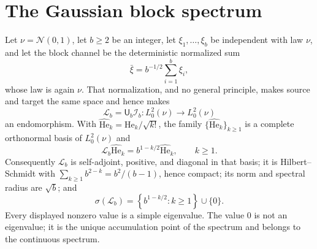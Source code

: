 \section{The Gaussian block spectrum}

Let \(\nu=\mathcal N(0,1)\), let \(b\geq2\) be an integer, let \(\xi_1,\dots,\xi_b\) be
independent with law \(\nu\), and let the block channel be the deterministic
normalized sum
\begin{equation}
\bar\xi=b^{-1/2}\sum_{i=1}^b\xi_i,
\label{eq:rg-gaussian-block-statistic}
\end{equation}
whose law is again \(\nu\). That normalization, and no general principle, makes source
and target the same space and hence makes
\begin{equation}
\mathscr L_b=\mathsf U_b\mathscr I_b:L^2_0(\nu)\longrightarrow L^2_0(\nu)
\label{eq:rg-gaussian-score-operator}
\end{equation}
an endomorphism. With \(\widehat{\mathrm{He}}_k=\mathrm{He}_k/\sqrt{k!}\), the family
\(\{\widehat{\mathrm{He}}_k\}_{k\geq1}\) is a complete orthonormal basis of \(L^2_0(\nu)\) and
\begin{equation}
\mathscr L_b\widehat{\mathrm{He}}_k=b^{1-k/2}\widehat{\mathrm{He}}_k,
\qquad k\geq1.
\label{eq:rg-hermite-eigenvalues}
\end{equation}
Consequently \(\mathscr L_b\) is self-adjoint, positive, and diagonal in that basis; it
is Hilbert--Schmidt with \(\sum_{k\geq1}b^{2-k}=b^2/(b-1)\), hence compact; its norm
and spectral radius are \(\sqrt b\); and
\begin{equation}
\sigma(\mathscr L_b)
=\left\{b^{1-k/2}:k\geq1\right\}\cup\{0\}.
\label{eq:rg-hermite-spectrum}
\end{equation}
Every displayed nonzero value is a simple eigenvalue. The value \(0\) is not an
eigenvalue; it is the unique accumulation point of the spectrum and belongs to the
continuous spectrum. 

